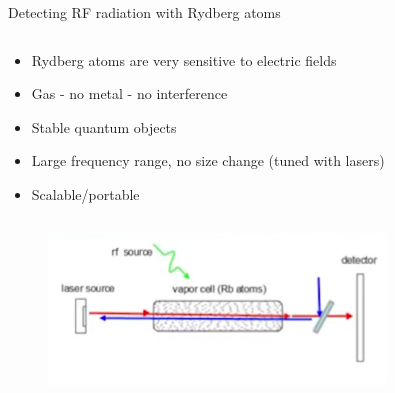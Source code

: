 \begin{columnframe}{Detecting RF radiation with Rydberg atoms}
    \begin{column}{0.5\textwidth}
        \begin{itemize}
            \item Rydberg atoms are very sensitive to electric fields
            \item Gas - no metal - no interference
            \item Stable quantum objects
            \item Large frequency range, no size change (tuned with lasers)
            \item Scalable/portable
        \end{itemize}
    \end{column}
    \begin{column}{0.5\textwidth}
        \begin{figure}
            \centering
            \includegraphics[width=0.8\textwidth]{images/detection_diagram.png}
        \end{figure}
    \end{column}
\end{columnframe}

